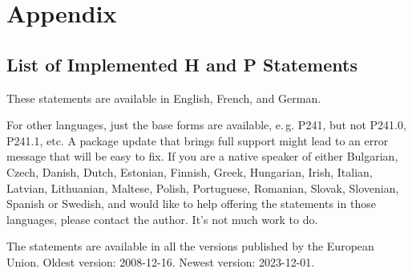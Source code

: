 \documentclass[a4paper,notitlepage,parskip=half]{scrreprt}
\begin{document}
\appendix
\chapter{Appendix}

\section{List of Implemented H and P Statements}

These statements are available in English, French, and German.

For other languages, just the base forms are available, e.\,g. P241, but not P241.0, P241.1, etc.
A package update that brings full support might lead to an error message that will be easy to fix.
If you are a native speaker of either
Bulgarian,
Czech,
Danish,
Dutch,
Estonian,
Finnish,
Greek,
Hungarian,
Irish,
Italian,
Latvian,
Lithuanian,
Maltese,
Polish,
Portuguese,
Romanian,
Slovak,
Slovenian,
Spanish or
Swedish,
and would like to help offering the statements in those languages, please
contact the author. It's not much work to do.

The statements are available in all the versions published by the European Union. Oldest version: 2008-12-16. Newest version: 2023-12-01.%

\medskip
\end{document}
